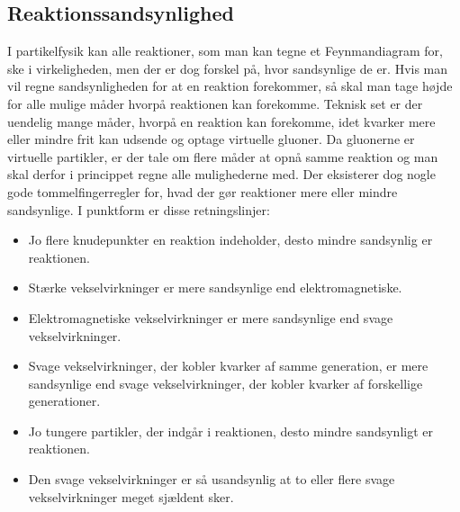 \subsection{Reaktionssandsynlighed} \label{sec:reaktionssandsynlighed}
I partikelfysik kan alle reaktioner, som man kan tegne et Feynmandiagram for, ske i virkeligheden, men der er dog forskel på, hvor sandsynlige de er. Hvis man vil regne sandsynligheden for at en reaktion forekommer, så skal man tage højde for alle mulige måder hvorpå reaktionen kan forekomme. Teknisk set er der uendelig mange måder, hvorpå en reaktion kan forekomme, idet kvarker mere eller mindre frit kan udsende og optage virtuelle gluoner. Da gluonerne er virtuelle partikler, er der tale om flere måder at opnå samme reaktion og man skal derfor i princippet regne alle mulighederne med. Der eksisterer dog nogle gode tommelfingerregler for, hvad der gør reaktioner mere eller mindre sandsynlige. I punktform er disse retningslinjer:
%
\begin{itemize}
    \item Jo flere knudepunkter en reaktion indeholder, desto mindre sandsynlig er reaktionen.
    \item Stærke vekselvirkninger er mere sandsynlige end elektromagnetiske.
    \item Elektromagnetiske vekselvirkninger er mere sandsynlige end svage vekselvirkninger.
    \item Svage vekselvirkninger, der kobler kvarker af samme generation, er mere sandsynlige end svage vekselvirkninger, der kobler kvarker af forskellige generationer.
    \item Jo tungere partikler, der indgår i reaktionen, desto mindre sandsynligt er reaktionen.
    \item Den svage vekselvirkninger er så usandsynlig at to eller flere svage vekselvirkninger  meget sjældent sker.
\end{itemize}
%
